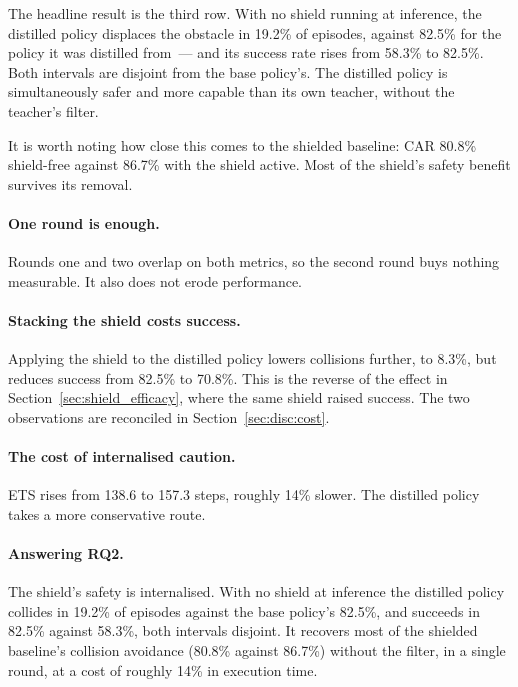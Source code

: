 \documentclass[a4paper,11pt]{report}
\begin{document}
The headline result is the third row. With no shield running at inference, the distilled policy
displaces the obstacle in 19.2\% of episodes, against 82.5\% for the policy it was distilled
from~--- and its success rate rises from 58.3\% to 82.5\%. Both intervals are disjoint from the
base policy's. The distilled policy is simultaneously safer and more capable than its own teacher,
without the teacher's filter.

It is worth noting how close this comes to the shielded baseline: CAR 80.8\% shield-free against
86.7\% with the shield active. Most of the shield's safety benefit survives its removal.

\paragraph{One round is enough.}
Rounds one and two overlap on both metrics, so the second round buys nothing measurable. It also
does not erode performance.

\paragraph{Stacking the shield costs success.}
Applying the shield to the distilled policy lowers collisions further, to 8.3\%, but reduces success
from 82.5\% to 70.8\%. This is the reverse of the effect in Section~\ref{sec:shield_efficacy}, where
the same shield raised success. The two observations are reconciled in
Section~\ref{sec:disc:cost}.

\paragraph{The cost of internalised caution.}
ETS rises from 138.6 to 157.3 steps, roughly 14\% slower. The distilled policy takes a more
conservative route.

\paragraph{Answering RQ2.}
The shield's safety is internalised. With no shield at inference the distilled policy collides in
19.2\% of episodes against the base policy's 82.5\%, and succeeds in 82.5\% against 58.3\%, both
intervals disjoint. It recovers most of the shielded baseline's collision avoidance (80.8\% against
86.7\%) without the filter, in a single round, at a cost of roughly 14\% in execution time.
\end{document}
